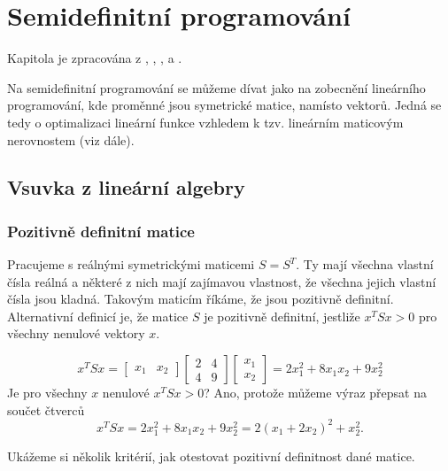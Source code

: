\chapter{Semidefinitní programování}

Kapitola je zpracována z \cite{semidefinite-optimization-and-convex-algebraic-geometry}, \cite{aspects-of-semidefinite-programming}, \cite{linear-algebra-and-learning-from-data}, \cite{approximation-algorithms} a \cite{ko}.

Na semidefinitní programování se můžeme dívat jako na zobecnění lineárního programování, kde proměnné jsou symetrické matice, namísto vektorů. Jedná se tedy o optimalizaci lineární funkce vzhledem k tzv. lineárním maticovým nerovnostem (viz dále).

\section{Vsuvka z lineární algebry}

\subsection*{Pozitivně definitní matice}

Pracujeme s reálnými symetrickými maticemi $S = S^T$. Ty mají všechna vlastní čísla reálná a některé z nich mají zajímavou vlastnost, že všechna jejich vlastní čísla jsou kladná. Takovým maticím říkáme, že jsou pozitivně definitní. Alternativní definicí je, že matice $S$ je pozitivně definitní, jestliže $x^TSx > 0$ pro všechny nenulové vektory $x$.

\begin{pr}
$$
    x^T S x = 
    \begin{bmatrix}
        x_1 & x_2
    \end{bmatrix}
    \begin{bmatrix}
        2 & 4 \\
        4 & 9
    \end{bmatrix}
    \begin{bmatrix}
        x_1 \\
        x_2
    \end{bmatrix} =
    2 x_1^2 + 8 x_1 x_2 + 9 x_2^2
$$
Je pro všechny $x$ nenulové $x^TSx > 0$? Ano, protože můžeme výraz přepsat na součet čtverců
$$
    x^TSx = 2 x_1^2 + 8 x_1 x_2 + 9 x_2^2 = 2 (x_1 + 2 x_2)^2 + x_2^2.
$$
\end{pr}

Ukážeme si několik kritérií, jak otestovat pozitivní definitnost dané matice.


